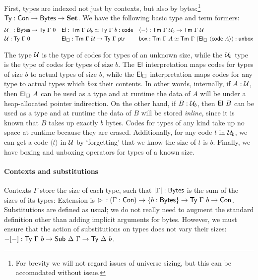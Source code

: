 First, types are indexed not just by contexts, but also by
bytes:\footnote{For brevity we will not regard issues of universe sizing, but this can
be accomodated without issue.} $\textsf{Ty} : \textsf{Con} \to \textsf{Bytes} \to \textbf{Set}$.
We have the following basic type and term formers:
{\small%
\[
\begin{alignedat}{3}
&\univ_{\_} : \Bytes \to \Ty\ \Gamma\ 0 \quad  &&\El : \Tm\ \Gamma\ \univ_b \simeq \Ty\ \Gamma\ b : \code \quad  &&\langle-\rangle : \Tm\ \Gamma\ \univ_b \to \Tm\ \Gamma\ \univ \\
&\univ : \Ty\ \Gamma\ 0 \quad &&\El_\square : \Tm\ \Gamma\ \univ \to \Ty\ \Gamma\ \ptr\quad  && \syn{box} : \Tm\ \Gamma\ A \simeq \Tm\ \Gamma\ (\El_\square\ \langle\code\ A\rangle) : \syn{unbox} \\
\end{alignedat}
\]}

The type \(\mathcal{U}\) is the type of codes for types of an unknown size, while the
\(\mathcal{U}_b\) type is the type of codes for types of size \(b\). The \(\textsf{El}\)
interpretation maps codes for types of size \(b\) to actual types of size \(b\),
while the \(\textsf{El}_\square\) interpretation maps codes for any type to actual types
which \emph{box} their contents. In other words, internally, if \(A : \mathcal{U}\),
then \(\textsf{El}_\square\ A\) can be used as a type and at runtime the data of \(A\)
will be under a heap-allocated pointer indirection. On the other hand, if \(B :
\mathcal{U}_b\), then \(\textsf{El}\ B\) can be used as a type and at runtime the data of
\(B\) will be stored \emph{inline}, since it is known that \(B\) takes up
exactly \(b\) bytes. Codes for types of any kind take up no space at runtime
because they are erased.
Additionally, for any code \(t\) in \(\mathcal{U}_b\), we can get a code
\(\langle t \rangle\) in \(\mathcal{U}\) by `forgetting' that we know the size
of \(t\) is \(b\). Finally, we have boxing and unboxing operators for types of a known size.

\paragraph{Contexts and
substitutions}\label{contexts-and-substitutions}

Contexts $\Gamma$ store the size of each type, such that $|\Gamma| : \textsf{Bytes}$ is the sum
of the sizes of its types: Extension is $\rhd\, : (\Gamma :
\textsf{Con}) \to \{b : \textsf{Bytes}\} \to \textsf{Ty}\ \Gamma\ b \to \textsf{Con}$. Substitutions are defined
as usual; we do not really need to augment the standard definition other than
adding implicit arguments for bytes. However, we must ensure that the action of
substitutions on types does not vary their sizes: $-[-] : \textsf{Ty}\ \Gamma\ b \to
\textsf{Sub}\ \Delta\ \Gamma \to \textsf{Ty}\ \Delta\ b$.

